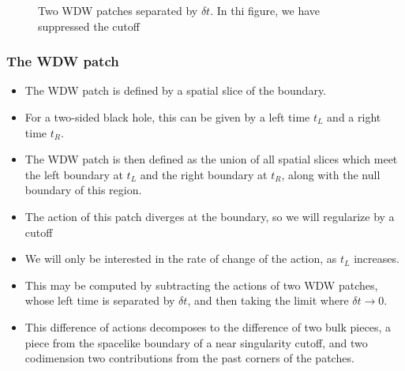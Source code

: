\documentclass[8pt,aspectratio=169]{beamer}
\begin{document}
\begin{frame}
\begin{minipage}[t]{0.48\linewidth}
\begin{figure}
\begin{center}
    \end{center}
    \caption{Two WDW patches separated by $\delta t$.  In thi figure, we have suppressed the cutoff}
    \label{fig:2WDW}
\end{figure}

\end{minipage}

\end{frame}


\begin{frame}
\frametitle{The WDW patch}

\begin{minipage}[t]{0.5\linewidth}

\begin{itemize}

\item The WDW patch is defined by a spatial slice of the boundary. 

\item For a two-sided black hole, this can be given by a left time $t_L$ and a right time $t_R$.

\item The WDW patch is then defined as the union of all spatial slices which meet the left boundary at $t_L$ and the right boundary at $t_R$, along with the null boundary of this region.

\item The action of this patch diverges at the boundary, so we will regularize by a cutoff

\item We will only be interested in the rate of change of the action, as $t_L$ increases.

\item This may be computed by subtracting the actions of two WDW patches, whose left time is separated by $\delta t$, and then taking the limit where $\delta t \rightarrow 0$.

\item This difference of actions decomposes to the difference of two bulk pieces, a piece from the spacelike boundary of a near singularity cutoff, and two codimension two contributions from the past corners of the patches.

\end{itemize}

\end{minipage}\hfill
%
\begin{minipage}[t]{0.48\linewidth}

\begin{figure}
    \begin{center}
    

\end{center}
\end{figure}
\end{minipage}
\end{frame}
\end{document}
